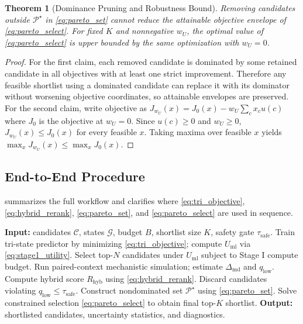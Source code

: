 \documentclass{article} %
\newtheorem{theorem}{Theorem}[section]
\begin{document}
\begin{theorem}[Dominance Pruning and Robustness Bound]
\label{thm:pareto}
Removing candidates outside $\mathcal{P}^{\star}$ in \eqref{eq:pareto_set} cannot reduce the attainable objective envelope of \eqref{eq:pareto_select}. For fixed $K$ and nonnegative $w_U$, the optimal value of \eqref{eq:pareto_select} is upper bounded by the same optimization with $w_U=0$.
\end{theorem}
\begin{proof}
For the first claim, each removed candidate is dominated by some retained candidate in all objectives with at least one strict improvement. Therefore any feasible shortlist using a dominated candidate can replace it with its dominator without worsening objective coordinates, so attainable envelopes are preserved. For the second claim, write objective as $J_{w_U}(x)=J_0(x)-w_U\sum_c x_cu(c)$ where $J_0$ is the objective at $w_U=0$. Since $u(c)\ge 0$ and $w_U\ge 0$, $J_{w_U}(x)\le J_0(x)$ for every feasible $x$. Taking maxima over feasible $x$ yields $\max_x J_{w_U}(x)\le \max_x J_0(x)$.\qedhere
\end{proof}

\subsection{End-to-End Procedure}
 summarizes the full workflow and clarifies where \eqref{eq:tri_objective}, \eqref{eq:hybrid_rerank}, \eqref{eq:pareto_set}, and \eqref{eq:pareto_select} are used in sequence.

\begin{algorithm}[t]
\caption{Hybrid conditional ranking and Pareto shortlist selection.}
\label{alg:pipeline}
\begin{algorithmic}[1]
\STATE \textbf{Input:} candidates $\mathcal{C}$, states $\mathcal{G}$, budget $B$, shortlist size $K$, safety gate $\tau_{\mathrm{safe}}$.
\STATE Train tri-state predictor by minimizing \eqref{eq:tri_objective}; compute $U_{\mathrm{ml}}$ via \eqref{eq:stage1_utility}.
\STATE Select top-$N$ candidates under $U_{\mathrm{ml}}$ subject to Stage I compute budget.
\STATE Run paired-context mechanistic simulation; estimate $\Delta_{\mathrm{md}}$ and $q_{\mathrm{low}}$.
\STATE Compute hybrid score $R_{\mathrm{hyb}}$ using \eqref{eq:hybrid_rerank}.
\ENDFOR
\STATE Discard candidates violating $q_{\mathrm{low}}\le\tau_{\mathrm{safe}}$.
\STATE Construct nondominated set $\mathcal{P}^{\star}$ using \eqref{eq:pareto_set}.
\STATE Solve constrained selection \eqref{eq:pareto_select} to obtain final top-$K$ shortlist.
\STATE \textbf{Output:} shortlisted candidates, uncertainty statistics, and diagnostics.
\end{algorithmic}
\end{algorithm}
\end{document}
